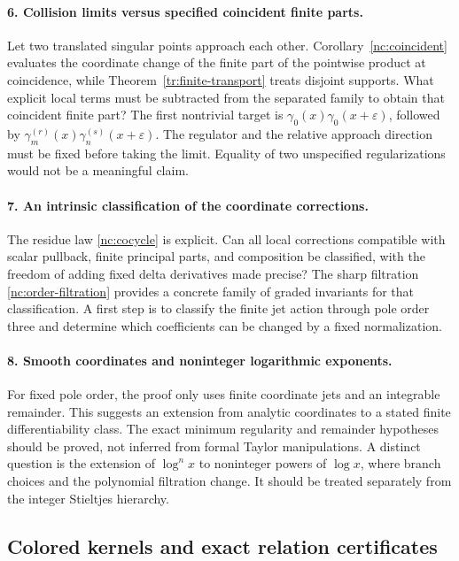 \documentclass[11pt,a4paper]{article}
\numberwithin{equation}{section}
\theoremstyle{definition}
\theoremstyle{remark}
\begin{document}
\paragraph{6. Collision limits versus specified coincident finite parts.}
Let two translated singular points approach each other.
Corollary~\ref{nc:coincident} evaluates the coordinate change of the
finite part of the pointwise product at coincidence, while
Theorem~\ref{tr:finite-transport} treats disjoint supports.
What explicit local terms must be subtracted from the separated
family to obtain that coincident finite part? The first nontrivial
target is $\gamma_0(x)\gamma_0(x+\varepsilon)$, followed by
$\gamma_m^{(r)}(x)\gamma_n^{(s)}(x+\varepsilon)$.
The regulator and the relative approach direction must be fixed
before taking the limit. Equality of two unspecified
regularizations would not be a meaningful claim.

\paragraph{7. An intrinsic classification of the coordinate corrections.}
The residue law \eqref{nc:cocycle} is explicit. Can all local
corrections compatible with scalar pullback, finite principal parts,
and composition be classified, with the freedom of adding fixed
delta derivatives made precise? The sharp filtration
\eqref{nc:order-filtration} provides a concrete family of graded
invariants for that classification. A first step is to classify
the finite jet action through pole order three and determine
which coefficients can be changed by a fixed normalization.

\paragraph{8. Smooth coordinates and noninteger logarithmic exponents.}
For fixed pole order, the proof only uses finite coordinate jets
and an integrable remainder. This suggests an extension from
analytic coordinates to a stated finite differentiability class.
The exact minimum regularity and remainder hypotheses should be
proved, not inferred from formal Taylor manipulations. A distinct
question is the extension of $\log^n x$ to noninteger powers of
$\log x$, where branch choices and the polynomial filtration change.
It should be treated separately from the integer Stieltjes hierarchy.

\subsection{Colored kernels and exact relation certificates}
\end{document}
